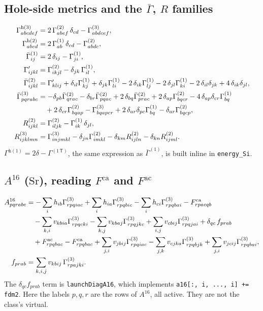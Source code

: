 \documentclass[11pt]{article}
\newcommand{\code}[1]{\texttt{#1}}
\newcommand{\G}[1]{\Gamma^{(#1)}}
\newcommand{\Gh}[1]{\Gamma^{\mathrm{h}(#1)}}
\newcommand{\Gb}[1]{\bar\Gamma^{(#1)}}
\newcommand{\Fca}{F^{\mathrm{ca}}}
\newcommand{\Fac}{F^{\mathrm{ac}}}
\newcommand{\cls}[1]{\ensuremath{\mathrm{#1}}}
\begin{document}
\subsection{\texorpdfstring{Hole-side metrics and the $\bar\Gamma$, $R$ families}{Hole-side metrics and the Gamma-bar, R families}}
\begin{align}
\Gh3_{abcdef} &= 2\,\G2_{abef}\,\delta_{cd} - \G3_{abdcef}, \label{eq:dmh3}\\
\Gh2_{abcd} &= 2\,\G1_{ab}\,\delta_{cd} - \G2_{abdc}, \label{eq:dmh2}\\
\Gb1_{ij} &= 2\,\delta_{ij} - \G1_{ji}, \\
\Gamma'_{ijkl} &= \G2_{ikjl} - \delta_{jk}\,\G1_{il}, \\
\Gb2_{ijkl} &= \Gamma'_{klij} + \delta_{il}\G1_{kj} + \delta_{jk}\G1_{li}
  - 2\,\delta_{ik}\G1_{lj} - 2\,\delta_{jl}\G1_{ki}
  - 2\,\delta_{il}\delta_{jk} + 4\,\delta_{ik}\delta_{jl}, \\
\Gb3_{pqrabc} &= -\delta_{pb}\Gb2_{qrac} - \delta_{br}\Gb2_{pqac}
  + 2\,\delta_{bq}\Gb2_{prac} + 2\,\delta_{ap}\G2_{bqcr}
  - 4\,\delta_{ap}\delta_{cr}\G1_{bq} \notag\\
  &\quad + 2\,\delta_{cr}\G2_{bqap} - \G3_{bqapcr}
  + 2\,\delta_{ar}\delta_{pc}\G1_{bq} - \delta_{ar}\G2_{bqcp}, \\
R^{(2)}_{ijkl} &= \G2_{iljk} - \G1_{ik}\,\delta_{jl}, \\
R^{(3)}_{ijklmn} &= \G3_{injmkl} - \delta_{jn}\G2_{imkl}
  - \delta_{km}R^{(2)}_{ijln} - \delta_{kn}R^{(2)}_{ijml}.
\end{align}
$\Gh1 = 2\delta - \G{1\,\mathsf T}$, the same expression as $\Gb1$, is built
inline in \code{energy\_Si}.

\subsection{\texorpdfstring{$A^{16}$ (\cls{Sr}), reading $\Fca$ and $\Fac$}{A16 (Sr), reading f3ca and f3ac}}
\begin{align}
A^{16}_{pqrabc} &= -\sum_{i} h_{ib}\G3_{rpqiac} + \sum_{i} h_{ia}\G3_{rpqbic}
   - \sum_{i} h_{ci}\G3_{rpqbai} - \Fca_{rpacqb} \notag\\
 &\quad - \sum_{k,i} v_{kbia}\G3_{rpqcki} - \sum_{k,j} v_{kbaj}\G3_{rpqjkc}
   + \sum_{i,j} v_{cbij}\G3_{rpqjai} + \delta_{qc}\,f_{prab} \notag\\
 &\quad + \Fac_{rpqbac} - \Fca_{rpqbac}
   + \sum_{j,i} v_{jbij}\G3_{rpqiac} - \sum_{j,k} v_{cjka}\G3_{rpqbjk}
   + \sum_{j,i} v_{jcij}\G3_{rpqbai}, \\
f_{prab} &= \sum_{k,i,j} v_{kbij}\,\G3_{rpajki}.
\end{align}
The $\delta_{qc}f_{prab}$ term is \code{launchDiagA16}, which implements
\code{a16[:, i, ..., i] += fdm2}. Here the labels $p,q,r$ are the rows of
$A^{16}$, all active. They are not the class's virtual.
\end{document}
